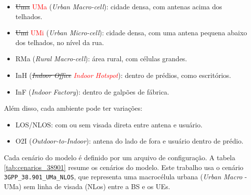 \begin{itemize}
  \item \sout{Uma} \textcolor{red}{UMa} (\textit{Urban Macro-cell}): cidade densa, com antenas acima dos telhados. 
  \item \sout{Umi} \textcolor{red}{UMi} (\textit{Urban Micro-cell}): cidade densa, com uma antena pequena abaixo dos telhados, no nível da rua. 
  \item RMa (\textit{Rural Macro-cell}): área rural, com células grandes. 
  \item InH (\sout{\textit{Indoor Office}} \textcolor{red}{\textit{Indoor Hotspot}}): dentro de prédios, como escritórios.
  \item InF (\textit{Indoor Factory}): dentro de galpões de fábrica. 
\end{itemize}


Além disso, cada ambiente pode ter variações: 

\begin{itemize}
  \item LOS/NLOS: com ou sem visada direta entre antena e usuário. 
  \item O2I (\textit{Outdoor-to-Indoor}): antena do lado de fora e usuário dentro de prédio.         
\end{itemize}


Cada cenário do modelo é definido por um arquivo de configuração. A tabela \ref{tab:cenarios_38901} resume os cenários do modelo. Este trabalho usa o cenário \texttt{3GPP\_\allowbreak{}38.901\_\allowbreak{}UMa\_\allowbreak{}NLOS}, que representa uma macrocélula urbana (\textit{Urban Macro} - UMa) sem linha de visada (NLos) entre a BS e os UEs. 


